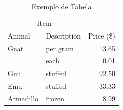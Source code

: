 	\begin{table}[h]
		\centering
		\caption{Exemplo de Tabela}
		\label{tab:exemplo_tabela}
		\begin{tabular}{llr}
		\hline
		\multicolumn{2}{c}{Item} 	&				\\ \cline{1-2}
		Animal	 					& Description 	& Price (\$) 	\\ \hline
		Gnat	   					& per gram		& 13.65	  		\\
									& each			& 0.01	   		\\
		Gnu							& stuffed	 	& 92.50	  		\\
		Emu							& stuffed	 	& 33.33	  		\\
		Armadillo  & frozen	  		& 8.99	   		\\ \hline
		\end{tabular}
	\end{table}
